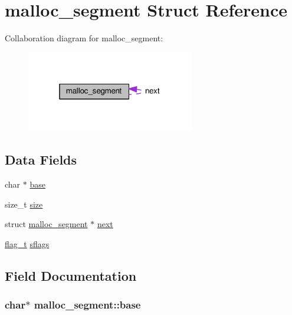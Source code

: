 \hypertarget{structmalloc__segment}{}\section{malloc\+\_\+segment Struct Reference}
\label{structmalloc__segment}


Collaboration diagram for malloc\+\_\+segment\+:\nopagebreak
\begin{figure}[H]
\begin{center}
\leavevmode
\includegraphics[width=208pt]{structmalloc__segment__coll__graph}
\end{center}
\end{figure}
\subsection*{Data Fields}
\begin{DoxyCompactItemize}
\item 
char $\ast$ \hyperlink{structmalloc__segment_ad4c68a4113c3a4f9b167aadaa7c31b89}{base}
\item 
size\+\_\+t \hyperlink{structmalloc__segment_a392a23ee3bd7a167e5f6382793a8eba1}{size}
\item 
struct \hyperlink{structmalloc__segment}{malloc\+\_\+segment} $\ast$ \hyperlink{structmalloc__segment_a92c4c9f618dba33fd8628d743cc02f5a}{next}
\item 
\hyperlink{dl__malloc_8c_a98d45780d5103f1a6b54a549a3d12de2}{flag\+\_\+t} \hyperlink{structmalloc__segment_ac48f17d9495d732749db6544cabbec2c}{sflags}
\end{DoxyCompactItemize}


\subsection{Field Documentation}
\subsubsection[{\texorpdfstring{base}{base}}]{\setlength{\rightskip}{0pt plus 5cm}char$\ast$ malloc\+\_\+segment\+::base}\hypertarget{structmalloc__segment_ad4c68a4113c3a4f9b167aadaa7c31b89}{}\label{structmalloc__segment_ad4c68a4113c3a4f9b167aadaa7c31b89}
